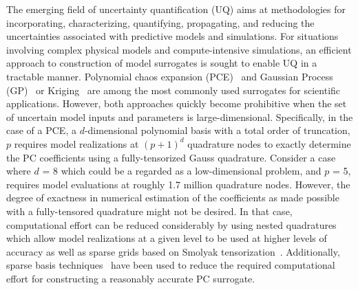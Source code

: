 The emerging field of uncertainty quantification (UQ) aims at methodologies for 
incorporating, characterizing, quantifying, propagating, and reducing the 
uncertainties associated with predictive models and simulations. For situations
involving complex physical models and compute-intensive simulations, an
efficient approach to construction of model surrogates is sought to enable UQ
in a tractable manner. Polynomial chaos expansion 
(PCE)~\cite{Xiu:2002,Ghanem:2003,Olivier:2010} and 
Gaussian Process (GP)~\cite{Rasmussen:2004} or Kriging~\cite{Stein:2012} are
among the most commonly used surrogates for scientific applications. However,
both approaches quickly become prohibitive when the set of uncertain model
inputs and parameters is large-dimensional. Specifically, in the case of a PCE,
a $d$-dimensional polynomial basis with a total order of truncation, $p$ 
requires model realizations at $(p+1)^d$ quadrature nodes to exactly determine the PC
coefficients using a fully-tensorized Gauss quadrature. Consider a case where $d$ = 8 which
could be a regarded as a low-dimensional problem, and $p$ = 5, requires model evaluations at
roughly 1.7 million quadrature nodes. However, the degree of exactness in numerical estimation 
of the coefficients as made possible with a fully-tensored quadrature might not be desired. In that
case, computational effort can be reduced considerably by using nested
quadratures~\cite{Gentleman:1972a,Gentleman:1972b,Novak:1999,Waldvogel:2006} which allow 
model realizations at a given level to be used at higher levels of accuracy as well as sparse grids
based on Smolyak tensorization~\cite{Smolyak:1963}. Additionally, sparse basis 
techniques~\cite{Peng:2014,Hampton:2015,Blatman:2011} have been used to reduce  the required
computational effort for constructing a reasonably accurate PC surrogate. 

